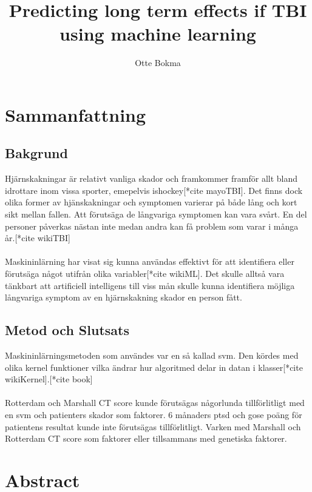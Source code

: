 \documentclass[11pt]{article}
\title{Predicting long term effects if TBI using machine learning}
\author{Otte Bokma}
\begin{document}
\begin{titlepage}
\maketitle
\end{titlepage}

\section*{Sammanfattning}

\subsection*{Bakgrund}

Hjärnskakningar är relativt vanliga skador och framkommer framför allt bland idrottare inom vissa sporter, emepelvis ishockey[*cite mayoTBI]. Det finns dock olika former av hjänskakningar och symptomen varierar på både lång och kort sikt mellan fallen. Att förutsäga de långvariga symptomen kan vara svårt. En del personer påverkas nästan inte medan andra kan få problem som varar i många år.[*cite wikiTBI]\\
\\
Maskininlärning har visat sig kunna användas effektivt för att identifiera eller förutsäga något utifrån olika variabler[*cite wikiML]. Det skulle alltså vara tänkbart att artificiell intelligens till viss mån skulle kunna identifiera möjliga långvariga symptom av en hjärnskakning skador en person fått.

\subsection*{Metod och Slutsats}
Maskininlärningsmetoden som användes var en så kallad \gls{svm}. Den kördes med olika kernel funktioner vilka ändrar hur algoritmed delar in datan i klasser[*cite wikiKernel].[*cite book]\\
\\
Rotterdam och Marshall CT score kunde förutsägas någorlunda tillförlitligt med en \gls{svm} och patienters skador som faktorer. 6 månaders \gls{ptsd} och \gls{gose} poäng för patientens resultat kunde inte förutsägas tillförlitligt. Varken med Marshall och Rotterdam CT score som faktorer eller tillsammans med genetiska faktorer.

\section*{Abstract}
\end{document}
